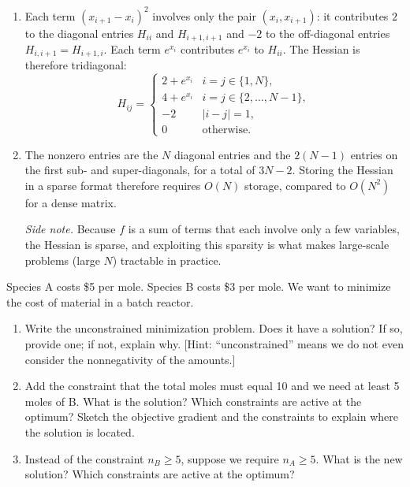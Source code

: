 \begin{solution}
    
    \begin{enumerate}[label=(\alph*)]
        \item Each term $(x_{i+1} - x_i)^2$ involves only the pair $(x_i, x_{i+1})$: it contributes $2$ to the diagonal entries $H_{ii}$ and $H_{i+1,i+1}$ and $-2$ to the off-diagonal entries $H_{i,i+1} = H_{i+1,i}$. Each term $e^{x_i}$ contributes $e^{x_i}$ to $H_{ii}$. The Hessian is therefore tridiagonal:
        \[
            H_{ij} =
            \begin{cases}
                2 + e^{x_i} & i = j \in \{1, N\}, \\
                4 + e^{x_i} & i = j \in \{2, \dots, N-1\}, \\
                -2 & |i - j| = 1, \\
                0 & \text{otherwise}.
            \end{cases}
        \]
        \item The nonzero entries are the $N$ diagonal entries and the $2(N-1)$ entries on the first sub- and super-diagonals, for a total of $3N - 2$. Storing the Hessian in a sparse format therefore requires $O(N)$ storage, compared to $O(N^2)$ for a dense matrix.

        \emph{Side note.} Because $f$ is a sum of terms that each involve only a few variables, the Hessian is sparse, and exploiting this sparsity is what makes large-scale problems (large $N$) tractable in practice.
    \end{enumerate}
    
\end{solution}


\begin{exercise} %
    Species A costs \$5 per mole. Species B costs \$3 per mole. We want to minimize the cost of material in a batch reactor.
    \begin{enumerate}[label=(\alph*)]
        \item Write the unconstrained minimization problem. Does it have a solution? If so, provide one; if not, explain why. [Hint: ``unconstrained'' means we do not even consider the nonnegativity of the amounts.]
        \item Add the constraint that the total moles must equal 10 and we need at least 5 moles of B. What is the solution? Which constraints are active at the optimum? Sketch the objective gradient and the constraints to explain where the solution is located.
        \item Instead of the constraint $n_B \geq 5$, suppose we require $n_A \geq 5$. What is the new solution? Which constraints are active at the optimum?
    \end{enumerate}
\end{exercise}

